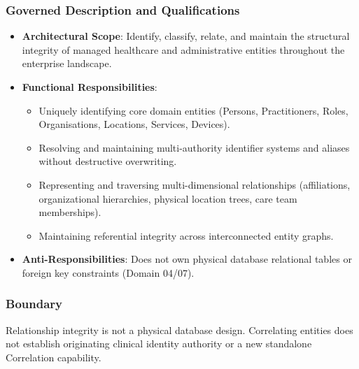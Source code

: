 \subsubsection*{Governed Description and Qualifications}

\begin{itemize}

\item
\textbf{Architectural Scope}: Identify, classify, relate, and maintain the structural integrity of managed healthcare and administrative entities throughout the enterprise landscape.



\item
\textbf{Functional Responsibilities}:


\begin{itemize}

\item
Uniquely identifying core domain entities (Persons, Practitioners, Roles, Organisations, Locations, Services, Devices).



\item
Resolving and maintaining multi-authority identifier systems and aliases without destructive overwriting.



\item
Representing and traversing multi-dimensional relationships (affiliations, organizational hierarchies, physical location trees, care team memberships).



\item
Maintaining referential integrity across interconnected entity graphs.



\end{itemize}


\item
\textbf{Anti-Responsibilities}: Does not own physical database relational tables or foreign key constraints (Domain 04/\allowbreak{}07).



\end{itemize}
\subsubsection*{Boundary}

Relationship integrity is not a physical database design. Correlating entities does not establish originating clinical identity authority or a new standalone Correlation capability.

